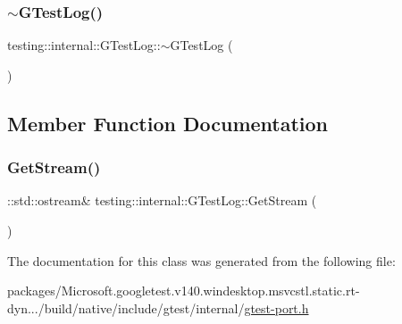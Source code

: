 \mbox{\label{classtesting_1_1internal_1_1_g_test_log_a978a099703bbaa0f380216e8d7ee03d3}} 
\subsubsection{\texorpdfstring{$\sim$GTestLog()}{~GTestLog()}}
{\footnotesize\ttfamily testing\+::internal\+::\+G\+Test\+Log\+::$\sim$\+G\+Test\+Log (\begin{DoxyParamCaption}{ }\end{DoxyParamCaption})}



\subsection{Member Function Documentation}
\mbox{\label{classtesting_1_1internal_1_1_g_test_log_aebb92e67d98eca69f0347d5121dab27a}} 
\subsubsection{\texorpdfstring{GetStream()}{GetStream()}}
{\footnotesize\ttfamily \+::std\+::ostream\& testing\+::internal\+::\+G\+Test\+Log\+::\+Get\+Stream (\begin{DoxyParamCaption}{ }\end{DoxyParamCaption})\hspace{0.3cm}{\ttfamily [inline]}}



The documentation for this class was generated from the following file\+:\begin{DoxyCompactItemize}
\item 
packages/\+Microsoft.\+googletest.\+v140.\+windesktop.\+msvcstl.\+static.\+rt-\/dyn.../build/native/include/gtest/internal/\mbox{\hyperlink{gtest-port_8h}{gtest-\/port.\+h}}\end{DoxyCompactItemize}
